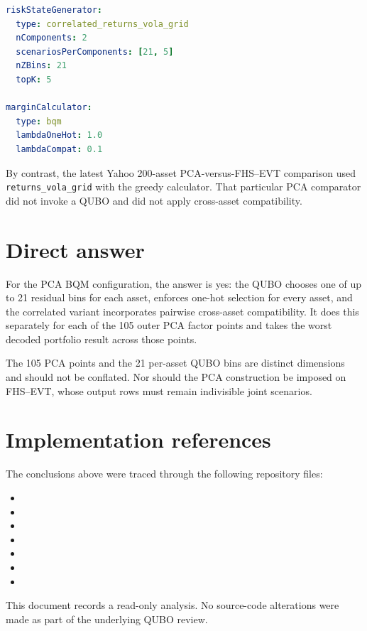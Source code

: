 \documentclass[11pt,a4paper]{article}
\begin{document}
\begin{lstlisting}[language=yaml]
riskStateGenerator:
  type: correlated_returns_vola_grid
  nComponents: 2
  scenariosPerComponents: [21, 5]
  nZBins: 21
  topK: 5

marginCalculator:
  type: bqm
  lambdaOneHot: 1.0
  lambdaCompat: 0.1
\end{lstlisting}

By contrast, the latest Yahoo 200-asset PCA-versus-FHS--EVT comparison used
\texttt{returns\_vola\_grid} with the greedy calculator. That particular PCA
comparator did not invoke a QUBO and did not apply cross-asset compatibility.

\section{Direct answer}

For the PCA BQM configuration, the answer is yes: the QUBO chooses one of up to
21 residual bins for each asset, enforces one-hot selection for every asset, and
the correlated variant incorporates pairwise cross-asset compatibility. It does
this separately for each of the 105 outer PCA factor points and takes the worst
decoded portfolio result across those points.

The 105 PCA points and the 21 per-asset QUBO bins are distinct dimensions and
should not be conflated. Nor should the PCA construction be imposed on FHS--EVT,
whose output rows must remain indivisible joint scenarios.

\section{Implementation references}

The conclusions above were traced through the following repository files:

\begin{itemize}
  \item {}
  \item {}
  \item {}
  \item {}
  \item {}
  \item {}
  \item {}
\end{itemize}

This document records a read-only analysis. No source-code alterations were made
as part of the underlying QUBO review.
\end{document}
